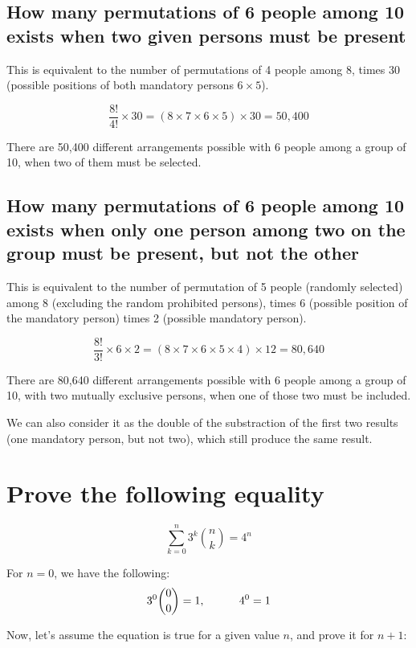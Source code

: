 \documentclass{article}
\begin{document}
\subsection{How many permutations of 6 people among 10 exists when two given persons must be present}

This is equivalent to the number of permutations of 4 people among 8, times 30 (possible positions of both mandatory persons $6\times5$).

$$ \frac{8!}{4!}\times30 = (8\times7\times6\times5)\times30 = 50,400 $$

There are 50,400 different arrangements possible with 6 people among a group of 10, when two of them must be selected.

\subsection{How many permutations of 6 people among 10 exists when only one person among two on the group must be present, but not the other}

This is equivalent to the number of permutation of 5 people (randomly selected) among 8 (excluding the random prohibited persons), times 6 (possible position of the mandatory person) times 2 (possible mandatory person).

$$ \frac{8!}{3!}\times6\times2 = (8\times7\times6\times5\times4)\times12 = 80,640 $$

There are 80,640 different arrangements possible with 6 people among a group of 10, with two mutually exclusive persons, when one of those two must be included.

We can also consider it as the double of the substraction of the first two results (one mandatory person, but not two), which still produce the same result.


\break\vfill
\section{Prove the following equality}

\begin{equation}
    \sum_{k=0}^n{3^k\binom{n}{k}} = 4^n
\end{equation}

For $n=0$, we have the following:
$$ 3^0\binom{0}{0} = 1, \hspace*{3em} 4^0 = 1 $$

Now, let's assume the equation is true for a given value $n$, and prove it for $n+1$:
\end{document}
